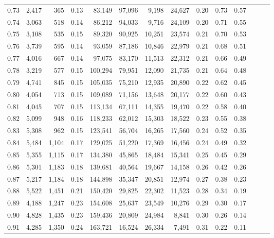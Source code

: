 \begin{tabular}{rrrrrrrrrrrrrr}
0.73 &  2,417 &    365 &  0.13 &   83,149 &   97,096 &   9,198 &  24,627 &  0.20 &  0.73 &      0.57 \\
0.74 &  3,063 &    518 &  0.14 &   86,212 &   94,033 &   9,716 &  24,109 &  0.20 &  0.71 &      0.55 \\
0.75 &  3,108 &    535 &  0.15 &   89,320 &   90,925 &  10,251 &  23,574 &  0.21 &  0.70 &      0.53 \\
0.76 &  3,739 &    595 &  0.14 &   93,059 &   87,186 &  10,846 &  22,979 &  0.21 &  0.68 &      0.51 \\
0.77 &  4,016 &    667 &  0.14 &   97,075 &   83,170 &  11,513 &  22,312 &  0.21 &  0.66 &      0.49 \\
0.78 &  3,219 &    577 &  0.15 &  100,294 &   79,951 &  12,090 &  21,735 &  0.21 &  0.64 &      0.48 \\
0.79 &  4,741 &    845 &  0.15 &  105,035 &   75,210 &  12,935 &  20,890 &  0.22 &  0.62 &      0.45 \\
0.80 &  4,054 &    713 &  0.15 &  109,089 &   71,156 &  13,648 &  20,177 &  0.22 &  0.60 &      0.43 \\
0.81 &  4,045 &    707 &  0.15 &  113,134 &   67,111 &  14,355 &  19,470 &  0.22 &  0.58 &      0.40 \\
0.82 &  5,099 &    948 &  0.16 &  118,233 &   62,012 &  15,303 &  18,522 &  0.23 &  0.55 &      0.38 \\
0.83 &  5,308 &    962 &  0.15 &  123,541 &   56,704 &  16,265 &  17,560 &  0.24 &  0.52 &      0.35 \\
0.84 &  5,484 &  1,104 &  0.17 &  129,025 &   51,220 &  17,369 &  16,456 &  0.24 &  0.49 &      0.32 \\
0.85 &  5,355 &  1,115 &  0.17 &  134,380 &   45,865 &  18,484 &  15,341 &  0.25 &  0.45 &      0.29 \\
0.86 &  5,301 &  1,183 &  0.18 &  139,681 &   40,564 &  19,667 &  14,158 &  0.26 &  0.42 &      0.26 \\
0.87 &  5,217 &  1,184 &  0.18 &  144,898 &   35,347 &  20,851 &  12,974 &  0.27 &  0.38 &      0.23 \\
0.88 &  5,522 &  1,451 &  0.21 &  150,420 &   29,825 &  22,302 &  11,523 &  0.28 &  0.34 &      0.19 \\
0.89 &  4,188 &  1,247 &  0.23 &  154,608 &   25,637 &  23,549 &  10,276 &  0.29 &  0.30 &      0.17 \\
0.90 &  4,828 &  1,435 &  0.23 &  159,436 &   20,809 &  24,984 &   8,841 &  0.30 &  0.26 &      0.14 \\
0.91 &  4,285 &  1,350 &  0.24 &  163,721 &   16,524 &  26,334 &   7,491 &  0.31 &  0.22 &      0.11 \\

\end{tabular}
